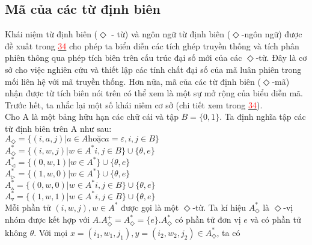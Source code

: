 \begin{flushleft}
\subsection{Mã của các từ định biên}
Khái niệm từ định biên ($\Diamond$ - từ) và ngôn ngữ từ định biên ($\Diamond$-ngôn ngữ) được đề xuất trong \hyperlink{page.81}{\textcolor{red}{34}} cho phép ta biển diễn các tích ghép truyền thống và tích phân phiên thông qua phép tích biên trên cấu trúc đại số mởi của các $\Diamond$-từ. Đây là cơ sở cho việc nghiên cứu và thiết lập các tính chất đại số của mã luân phiên trong mối liên hệ với mã truyền thống. Hơn nữa, mã của các từ định biên ($\Diamond$-mã) nhận được từ tích biên nói trên có thể xem là một sự mở rộng của biểu diễn mã.\\
\hspace{10mm}Trước hết, ta nhắc lại một số khái niêm cơ sở (chi tiết xem trong \hyperlink{page.81}{\textcolor{red}{34}}).\\
\hspace{10mm}Cho A là một bảng hữu hạn các chữ cái và tập $B = \{0,1\}$. Ta định nghĩa tập các từ định biên trên A như sau:\\
\hspace{20mm}$A_\Diamond = \{ (i,a,j) | a \in A \text{hoặc} a = \varepsilon, i, j \in B \}$\\
\hspace{20mm}$A^*_\Diamond = \{ (i,w,j) | w \in A^* i, j \in B \} \cup \{ \theta,e \}$ \\
\hspace{20mm}$A^*_\vartriangleleft = \{ (0,w,1) | w \in A^*\} \cup \{ \theta ,e \} $ \\
\hspace{20mm}$A^*_\vartriangleright = \{ (1,w,0) | w \in A^*\} \cup \{ \theta ,e \} $ \\
\hspace{20mm}$A^*_\vartriangle = \{ (0,w,0) | w \in A^* i, j \in B \} \cup \{ \theta,e \}$ \\ 
\hspace{20mm}$A^*_\triangledown = \{ (1,w,1) | w \in A^* i, j \in B \} \cup \{ \theta,e \}$ \\
\hspace{10mm} Mỗi phần tử $(i,w,j), w \in A^*$ được gọi là một $\Diamond$-từ. Ta kí hiệu $A^*_\Diamond$ là $\Diamond$-vị nhóm được kết hợp với $A.A^+_\Diamond = A^*_\Diamond = \{ e \}. A^*_\Diamond$ có phần tử đơn vị $e$ và có phần tử không $\theta$. Với mọi $x = (i_1, w_1, j_1), y = (i_2, w_2, j_2) \in A^*_\Diamond$, ta có  \\
\end{flushleft}
